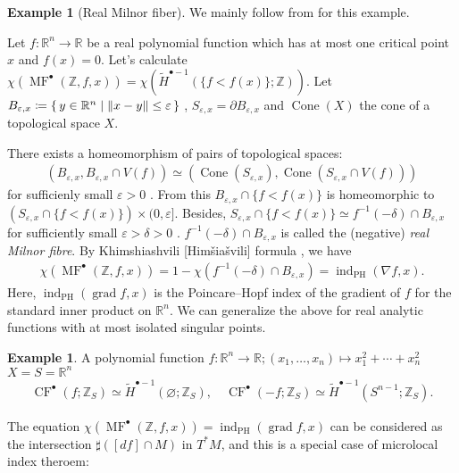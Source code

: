 \documentclass[a4paper,dvipdfmx,reqno,12pt]{amsart}
\theoremstyle{definition}
\newtheorem{Eg}[Thm]{Example}
\newcommand{\deq}{\coloneqq}
\newcommand{\emp}{\varnothing}%
\newcommand{\R}{\mathbb{R}}%
\newcommand{\Z}{\mathbb{Z}}%
\newcommand{\vep}{\varepsilon}%
\newcommand{\opn}[1]{\operatorname{#1}}
\numberwithin{equation}{section}
\begin{document}
\begin{Eg}[{Real Milnor fiber}] \label{eg:}
We mainly follow from \cite[3.2]{MR3779558} for this example.

Let $f\colon \R^{n}\to \R$ be a real polynomial function
which has at most one critical point $x$ and $f(x)=0$.
Let's calculate 
$\chi (\opn{MF}^{\bullet}(\Z,f,x))
=\chi(\tilde{H}^{\bullet-1}(\{f<f(x)\};\Z))$.
Let $B_{\vep,x}\deq \set{y\in \R^{n}\mid \|x-y\|\leq \vep}$
, $S_{\vep,x}=\partial B_{\vep,x}$ and 
$\opn{Cone}(X)$ the cone of a topological space $X$.

There exists a homeomorphism of pairs of
topological spaces:
\begin{align}
(B_{\vep,x},B_{\vep,x}\cap V(f))\simeq 
(\opn{Cone}(S_{\vep,x}),\opn{Cone}(S_{\vep,x}\cap V(f)))
\end{align}
for sufficienly small $\vep>0$
\cite[Theorem 2.10]{MR0239612}.
From this $B_{\vep,x}\cap\{f<f(x)\}$ is homeomorphic to
$(S_{\vep,x}\cap \{f<f(x)\})\times (0,\vep]$.
Besides, $S_{\vep,x}\cap \{f<f(x)\}\simeq 
f^{-1}(-\delta)\cap B_{\vep,x}$
for sufficiently small $\vep>\delta>0$ 
\cite[Lemma 5.10]{MR0239612}.
$f^{-1}(-\delta)\cap B_{\vep,x}$ is called 
the (negative) \emph{real Milnor fibre}.
By Khimshiashvili [Himšiašvili] formula \cite{MR0458467}, we have
\begin{align} \label{eq: Khim}
  \chi(\opn{MF}^{\bullet}(\Z,f,x))
=1-\chi(f^{-1}(-\delta)\cap B_{\vep,x})
=\opn{ind}_{\opn{PH}}(\nabla f,x).
\end{align}
Here, $\opn{ind}_{\opn{PH}}(\opn{grad} f,x)$ is the 
Poincare--Hopf index of the gradient of $f$ for the standard 
inner product on $\R^{n}$.
We can generalize the above for real analytic functions with 
at most isolated singular points.
\end{Eg}

\begin{Eg}
  A polynomial function $f:\R^{n}\to \R;(x_1,\ldots,x_n)\mapsto x_1^{2}+\cdots+x_n^{2}$
  $X=S=\R^{n}$
  \begin{align}
    \opn{CF}^{\bullet}(f;\Z_S)\simeq \tilde{H}^{\bullet-1}(\emp;\Z_S),
    \quad \opn{CF}^{\bullet}(-f;\Z_S) \simeq \tilde{H}^{\bullet-1}(S^{n-1};\Z_S).
  \end{align}
\end{Eg}
The equation $\chi(\opn{MF}^{\bullet}(\Z,f,x))=
\opn{ind}_{\opn{PH}}(\opn{grad} f,x)$ can be considered 
as the intersection $\sharp ([df]\cap M)$ in $T^{*}M$,
and this is a special case of
microlocal index theroem:
\end{document}
